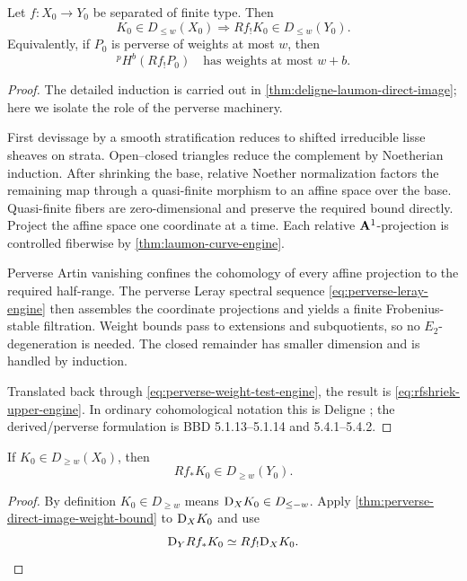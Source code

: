 \begin{theorem}
\label{thm:perverse-direct-image-weight-bound}
Let \(f:X_0\to Y_0\) be separated of finite type.  Then
\[
  K_0\in D_{\leq w}(X_0)
  \Longrightarrow
  Rf_!K_0\in D_{\leq w}(Y_0).
\tag{\thechapter.8}\label{eq:rfshriek-upper-engine}
\]
Equivalently, if \(P_0\) is perverse of weights at most \(w\), then
\[
  {}^pH^b(Rf_!P_0)
  \quad\text{has weights at most }w+b.
\tag{\thechapter.9}\label{eq:perverse-rfshriek-bound-engine}
\]
\end{theorem}

\begin{proof}
The detailed induction is carried out in
\cref{thm:deligne-laumon-direct-image}; here we isolate the role of the
perverse machinery.

First devissage by a smooth stratification reduces to shifted irreducible
lisse sheaves on strata.  Open--closed triangles reduce the complement by
Noetherian induction.  After shrinking the base, relative Noether
normalization factors the remaining map through a quasi-finite morphism to
an affine space over the base.  Quasi-finite fibers are zero-dimensional and
preserve the required bound directly.  Project the affine space one
coordinate at a time.  Each relative \(\mathbf A^1\)-projection is controlled
fiberwise by \cref{thm:laumon-curve-engine}.

Perverse Artin vanishing confines the cohomology of every affine projection
to the required half-range.  The perverse Leray spectral sequence
\eqref{eq:perverse-leray-engine} then assembles the coordinate projections
and yields a finite Frobenius-stable filtration.  Weight bounds pass to
extensions and subquotients, so no \(E_2\)-degeneration is needed.  The
closed remainder has smaller dimension and is handled by induction.

Translated back through \eqref{eq:perverse-weight-test-engine}, the result is
\eqref{eq:rfshriek-upper-engine}.  In ordinary cohomological notation this
is Deligne \cite[Thm.~3.3.1]{DeligneWeilII}; the derived/perverse formulation
is BBD 5.1.13--5.1.14 and 5.4.1--5.4.2.
\end{proof}

\begin{corollary}
\label{cor:rfstar-lower-engine}
If \(K_0\in D_{\geq w}(X_0)\), then
\[
  Rf_*K_0\in D_{\geq w}(Y_0).
\tag{\thechapter.10}\label{eq:rfstar-lower-engine}
\]
\end{corollary}

\begin{proof}
By definition \(K_0\in D_{\geq w}\) means
\(\mathrm D_XK_0\in D_{\leq-w}\).  Apply
\cref{thm:perverse-direct-image-weight-bound} to \(\mathrm D_XK_0\) and use
\[
  \mathrm D_YRf_*K_0\simeq Rf_!\mathrm D_XK_0.
\]
\end{proof}

